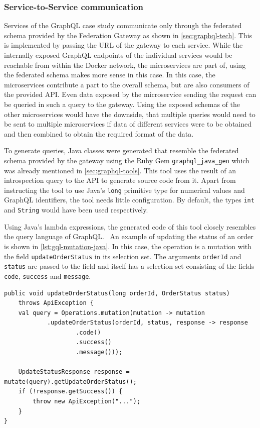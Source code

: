 \subsubsection{Service-to-Service communication}\label{sec:gql-s2s}

Services of the GraphQL case study communicate only through the federated schema provided by the Federation Gateway as shown in \autoref{sec:graphql-tech}.
This is implemented by passing the \ac{URL} of the gateway to each service.
While the internally exposed GraphQL endpoints of the individual services would be reachable from within the Docker network, the microservices are part of, using the federated schema makes more sense in this case.
In this case, the microservices contribute a part to the overall schema, but are also consumers of the provided \ac{API}.
Even data exposed by the microservice sending the request can be queried in such a query to the gateway.
Using the exposed schemas of the other microservices would have the downside, that multiple queries would need to be sent to multiple microservices if data of different services were to be obtained and then combined to obtain the required format of the data.

To generate queries, Java classes were generated that resemble the federated schema provided by the gateway using the Ruby Gem \texttt{graphql\_java\_gen} which was already mentioned in \autoref{sec:graphql-tools}.
This tool uses the result of an introspection query to the \ac{API} to generate source code from it.
Apart from instructing the tool to use Java's \texttt{long} primitive type for numerical values and GraphQL identifiers, the tool needs little configuration.
By default, the types \texttt{int} and \texttt{String} would have been used respectively.

Using Java's lambda expressions, the generated code of this tool closely resembles the query language of GraphQL.~%
An example of updating the status of an order is shown in \autoref{lst:gql-mutation-java}.
In this case, the operation is a mutation with the field \texttt{updateOrderStatus} in its selection set.
The arguments \texttt{orderId} and \texttt{status} are passed to the field and itself has a selection set consisting of the fields \texttt{code}, \texttt{success} and \texttt{message}.

\begin{minipage}{\linewidth}
\begin{lstlisting}[style=java-ext, caption={Formulating Queries against GraphQL \acsp{API} using GraphQLJavaGen}, label={lst:gql-mutation-java}]
public void updateOrderStatus(long orderId, OrderStatus status) 
    throws ApiException {
    val query = Operations.mutation(mutation -> mutation
            .updateOrderStatus(orderId, status, response -> response
                    .code()
                    .success()
                    .message()));

    UpdateStatusResponse response = mutate(query).getUpdateOrderStatus();
    if (!response.getSuccess()) {
        throw new ApiException("...");
    }
}
\end{lstlisting}
\end{minipage}


